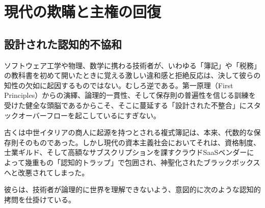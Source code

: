 \ifja
\chapter{現代の欺瞞と主権の回復}
\label{chap:introduction}

\section{設計された認知的不協和}
ソフトウェア工学や物理、数学に携わる技術者が、いわゆる「簿記」や「税務」の教科書を初めて開いたときに覚える激しい違和感と拒絶反応は、決して彼らの知性の欠如に起因するものではない。むしろ逆である。第一原理（First Principles）からの演繹、論理的一貫性、そして保存則の普遍性を信じる訓練を受けた健全な頭脳であるからこそ、そこに蔓延する「設計された不整合」にスタックオーバーフローを起こしているにすぎない。

古くは中世イタリアの商人に起源を持つとされる複式簿記は、本来、代数的な保存則そのものであった。しかし現代の資本主義社会においてそれは、資格制度、士業ギルド、そして高額なサブスクリプションを課すクラウドSaaSベンダーによって幾重もの「認知的トラップ」で包囲され、神聖化されたブラックボックスへと改悪されてしまった。

彼らは、技術者が論理的に世界を理解できないよう、意図的に次のような認知的拷問を仕掛けている。

